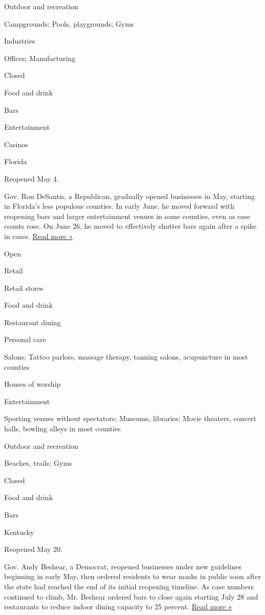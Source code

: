 Outdoor and recreation

Campgrounds; Pools, playgrounds; Gyms

Industries

Offices; Manufacturing

Closed

Food and drink

Bars

Entertainment

Casinos

Florida

Reopened May 4.

Gov. Ron DeSantis, a Republican, gradually opened businesses in May,
starting in Florida's less populous counties. In early June, he moved
forward with reopening bars and larger entertainment venues in some
counties, even as case counts rose. On June 26, he moved to effectively
shutter bars again after a spike in cases.
\href{https://www.tampabay.com/news/health/2020/06/26/drinking-alcohol-at-florida-bars-suspended/}{Read
more »}

Open

Retail

Retail stores

Food and drink

Restaurant dining

Personal care

Salons; Tattoo parlors, massage therapy, tanning salons, acupuncture in
most counties

Houses of worship

Entertainment

Sporting venues without spectators; Museums, libraries; Movie theaters,
concert halls, bowling alleys in most counties

Outdoor and recreation

Beaches, trails; Gyms

Closed

Food and drink

Bars

Kentucky

Reopened May 20.

Gov. Andy Beshear, a Democrat, reopened businesses under new guidelines
beginning in early May, then ordered residents to wear masks in public
soon after the state had reached the end of its initial reopening
timeline. As case numbers continued to climb, Mr. Beshear ordered bars
to close again starting July 28 and restaurants to reduce indoor dining
capacity to 25 percent.
\href{https://www.courier-journal.com/story/news/2020/07/27/kentucky-gov-andy-beshear-order-bar-closures-covid-cases-spike/5517328002/}{Read
more »}

